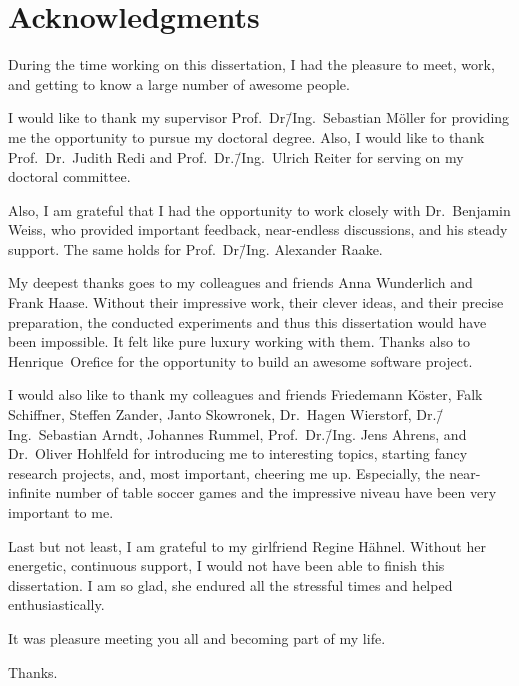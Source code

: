 
\bigskip

\begingroup
\let\clearpage\relax
\let\cleardoublepage\relax
\chapter*{Acknowledgments}
During the time working on this dissertation, I had the pleasure to meet, work, and getting to know a large number of awesome people.

I would like to thank my supervisor Prof.~Dr\=/Ing.~Sebastian Möller for providing me the opportunity to pursue my doctoral degree.
Also, I would like to thank Prof.~Dr.~Judith Redi and Prof.~Dr.\=/Ing.~Ulrich Reiter for serving on my doctoral committee.

Also, I am grateful that I had the opportunity to work closely with Dr.~Benjamin Weiss, who provided important feedback, near-endless discussions, and his steady support.
The same holds for Prof.~Dr\=/Ing. Alexander Raake.

My deepest thanks goes to my colleagues and friends Anna Wunderlich and Frank Haase.
Without their impressive work, their clever ideas, and their precise preparation, the conducted experiments and thus this dissertation would have been impossible.
It felt like pure luxury working with them.
Thanks also to Henrique~Orefice for the opportunity to build an awesome software project.

I would also like to thank my colleagues and friends Friedemann Köster, Falk Schiffner, Steffen Zander, Janto Skowronek, Dr.~Hagen Wierstorf, Dr.\=/Ing.~Sebastian Arndt, Johannes Rummel, Prof.~Dr.\=/Ing. Jens Ahrens, and Dr.~Oliver Hohlfeld for introducing me to interesting topics, starting fancy research projects, and, most important, cheering me up.
Especially, the near-infinite number of table soccer games and the impressive niveau have been very important to me.

Last but not least, I am grateful to my girlfriend Regine Hähnel.
Without her energetic, continuous support, I would not have been able to finish this dissertation.
I am so glad, she endured all the stressful times and helped enthusiastically.

\bigskip
It was pleasure meeting you all and becoming part of my life.

\bigskip
Thanks.

\endgroup
